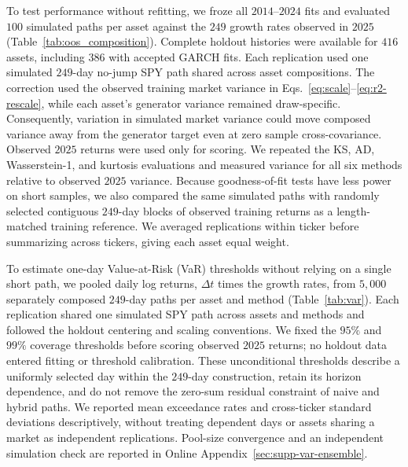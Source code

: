 To test performance without refitting, we froze all $2014$--$2024$
fits and evaluated $100$ simulated paths per asset against the $249$
growth rates observed in $2025$ (Table~\ref{tab:oos_composition}).
Complete holdout histories were available for $416$ assets, including
$386$ with accepted GARCH fits. Each replication used one simulated
$249$-day no-jump SPY path shared across asset compositions. The
correction used the observed training market variance in
Eqs.~\eqref{eq:scale}--\eqref{eq:r2-rescale}, while each asset's
generator variance remained draw-specific. Consequently, variation
in simulated market variance could move composed variance away from
the generator target even at zero sample cross-covariance. Observed
$2025$ returns were used only for scoring. We repeated the KS, AD,
Wasserstein-1, and kurtosis evaluations and measured variance for all
six methods relative to observed $2025$ variance. Because goodness-of-fit tests have less power on short samples, we
also compared the same simulated paths with randomly selected
contiguous $249$-day blocks of observed training returns as a
length-matched training reference. We averaged
replications within ticker before summarizing across tickers, giving
each asset equal weight.

To estimate one-day Value-at-Risk (VaR) thresholds without relying on
a single short path, we pooled daily log returns, $\Delta t$ times
the growth rates, from $5{,}000$ separately composed $249$-day paths
per asset and method (Table~\ref{tab:var}). Each replication shared
one simulated SPY path across assets and methods and followed the
holdout centering and scaling conventions. We fixed the $95\%$ and
$99\%$ coverage thresholds before scoring observed $2025$ returns;
no holdout data entered fitting or threshold calibration. These
unconditional thresholds describe a uniformly selected day within the
$249$-day construction, retain its horizon dependence, and do not
remove the zero-sum residual constraint of naive and hybrid paths.
We reported mean exceedance rates and cross-ticker standard deviations
descriptively, without treating dependent days or assets sharing a
market as independent replications. Pool-size convergence and an
independent simulation check are reported in Online
Appendix~\ref{sec:supp-var-ensemble}.


